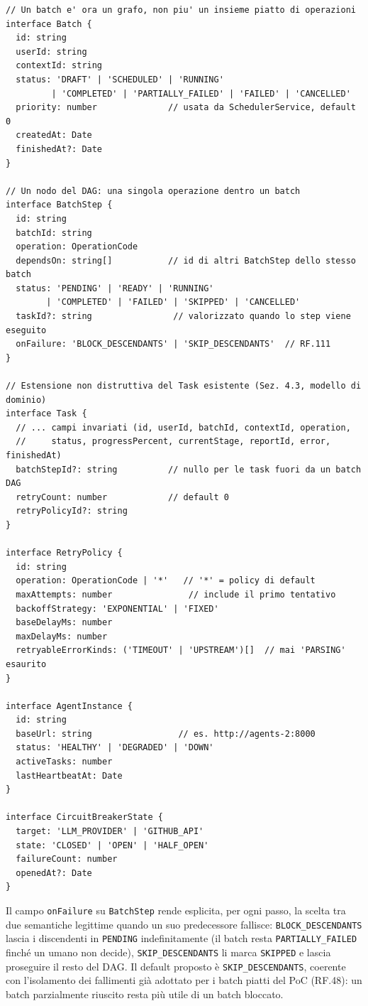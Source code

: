 \documentclass[11pt,a4paper]{article}
\begin{document}
\begin{lstlisting}[caption={Entita' nuove del modello di dominio dell'orchestratore.}, label={lst:orch-dominio}]
// Un batch e' ora un grafo, non piu' un insieme piatto di operazioni
interface Batch {
  id: string
  userId: string
  contextId: string
  status: 'DRAFT' | 'SCHEDULED' | 'RUNNING'
         | 'COMPLETED' | 'PARTIALLY_FAILED' | 'FAILED' | 'CANCELLED'
  priority: number              // usata da SchedulerService, default 0
  createdAt: Date
  finishedAt?: Date
}

// Un nodo del DAG: una singola operazione dentro un batch
interface BatchStep {
  id: string
  batchId: string
  operation: OperationCode
  dependsOn: string[]           // id di altri BatchStep dello stesso batch
  status: 'PENDING' | 'READY' | 'RUNNING'
        | 'COMPLETED' | 'FAILED' | 'SKIPPED' | 'CANCELLED'
  taskId?: string                // valorizzato quando lo step viene eseguito
  onFailure: 'BLOCK_DESCENDANTS' | 'SKIP_DESCENDANTS'  // RF.111
}

// Estensione non distruttiva del Task esistente (Sez. 4.3, modello di dominio)
interface Task {
  // ... campi invariati (id, userId, batchId, contextId, operation,
  //     status, progressPercent, currentStage, reportId, error, finishedAt)
  batchStepId?: string          // nullo per le task fuori da un batch DAG
  retryCount: number            // default 0
  retryPolicyId?: string
}

interface RetryPolicy {
  id: string
  operation: OperationCode | '*'   // '*' = policy di default
  maxAttempts: number               // include il primo tentativo
  backoffStrategy: 'EXPONENTIAL' | 'FIXED'
  baseDelayMs: number
  maxDelayMs: number
  retryableErrorKinds: ('TIMEOUT' | 'UPSTREAM')[]  // mai 'PARSING' esaurito
}

interface AgentInstance {
  id: string
  baseUrl: string                 // es. http://agents-2:8000
  status: 'HEALTHY' | 'DEGRADED' | 'DOWN'
  activeTasks: number
  lastHeartbeatAt: Date
}

interface CircuitBreakerState {
  target: 'LLM_PROVIDER' | 'GITHUB_API'
  state: 'CLOSED' | 'OPEN' | 'HALF_OPEN'
  failureCount: number
  openedAt?: Date
}
\end{lstlisting}

Il campo \texttt{onFailure} su \texttt{BatchStep} rende esplicita, per ogni passo, la scelta tra due semantiche legittime quando un suo predecessore fallisce: \texttt{BLOCK\_DESCENDANTS} lascia i discendenti in \texttt{PENDING} indefinitamente (il batch resta \texttt{PARTIALLY\_FAILED} finché un umano non decide), \texttt{SKIP\_DESCENDANTS} li marca \texttt{SKIPPED} e lascia proseguire il resto del DAG. Il default proposto è \texttt{SKIP\_DESCENDANTS}, coerente con l'isolamento dei fallimenti già adottato per i batch piatti del PoC (RF.48): un batch parzialmente riuscito resta più utile di un batch bloccato.
\end{document}
